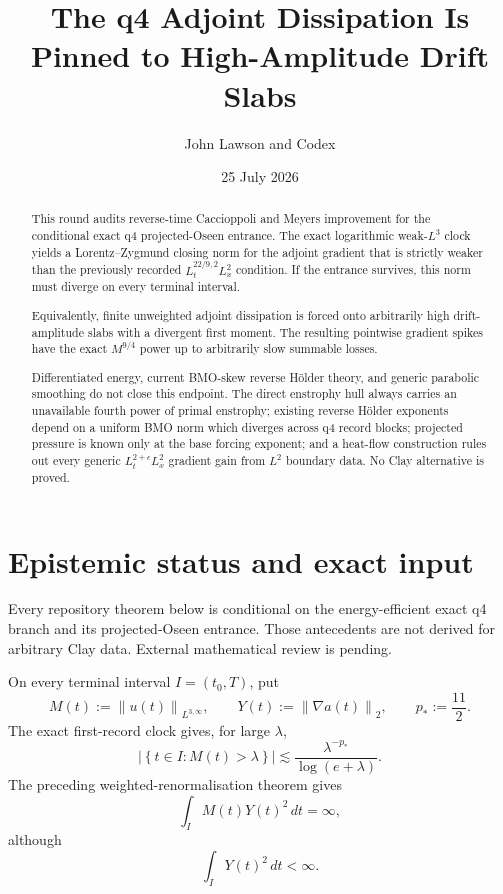 \documentclass[11pt]{article}
\title{The q4 Adjoint Dissipation Is Pinned to
High-Amplitude Drift Slabs}
\author{John Lawson and Codex}
\date{25 July 2026}
\theoremstyle{remark}
\newcommand{\norm}[1]{\left\|#1\right\|}
\newcommand{\set}[1]{\left\{#1\right\}}
\begin{document}
\maketitle

\begin{abstract}
This round audits reverse-time Caccioppoli and Meyers improvement for the
conditional exact q4 projected-Oseen entrance.  The exact logarithmic
weak-\(L^3\) clock yields a Lorentz--Zygmund closing norm for the
adjoint gradient that is strictly weaker than the previously recorded
\(L_t^{22/9,2}L_x^2\) condition.  If the entrance survives, this norm
must diverge on every terminal interval.

Equivalently, finite unweighted adjoint dissipation is forced onto
arbitrarily high drift-amplitude slabs with a divergent first moment.
The resulting pointwise gradient spikes have the exact
\(M^{9/4}\) power up to arbitrarily slow summable losses.

Differentiated energy, current BMO-skew reverse H\"older theory, and
generic parabolic smoothing do not close this endpoint.  The direct
enstrophy hull always carries an unavailable fourth power of primal
enstrophy; existing reverse H\"older exponents depend on a uniform BMO
norm which diverges across q4 record blocks; projected pressure is known
only at the base forcing exponent; and a heat-flow construction rules out
every generic \(L_t^{2+\epsilon}L_x^2\) gradient gain from \(L^2\)
boundary data.  No Clay alternative is proved.
\end{abstract}

\section{Epistemic status and exact input}

Every repository theorem below is conditional on the energy-efficient
exact q4 branch and its projected-Oseen entrance.  Those antecedents are
not derived for arbitrary Clay data.  External mathematical review is
pending.

On every terminal interval \(I=(t_0,T)\), put
\begin{equation}
\label{eq:MY}
 M(t):=\norm{u(t)}_{L^{3,\infty}},
 \qquad
 Y(t):=\norm{\nabla a(t)}_2,
 \qquad
 p_*:=\frac{11}{2}.
\end{equation}
The exact first-record clock gives, for large \(\lambda\),
\begin{equation}
\label{eq:clock}
 \left|\set{t\in I:M(t)>\lambda}\right|
 \lesssim
 \frac{\lambda^{-p_*}}{\log(e+\lambda)}.
\end{equation}
The preceding weighted-renormalisation theorem gives
\begin{equation}
\label{eq:weighted-infinite}
 \boxed{
 \int_I M(t)Y(t)^2\,dt=\infty,
 }
\end{equation}
although
\begin{equation}
\label{eq:unweighted-finite}
 \int_IY(t)^2\,dt<\infty.
\end{equation}
\end{document}
